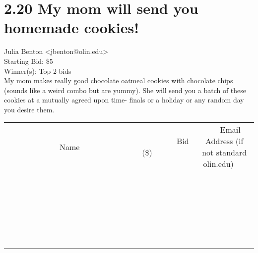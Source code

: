 \documentclass[11pt]{article}
\begin{document}
					\section*{2.20 My mom will send you homemade cookies!}
					Julia Benton <jbenton@olin.edu> \\
					Starting Bid: \$5 \\
					Winner(s): Top 2 bids \\
					My mom makes really good chocolate oatmeal cookies with chocolate chips (sounds like a weird combo but are yummy). She will send you a batch of these cookies at a mutually agreed upon time- finals or a holiday or any random day you desire them. \\
					[6ex]
					\begin{tabular}{c c c}
						~~~~~~~~~~~~~Name~~~~~~~~~~~~~ & ~~~~~~~~~Bid (\$)~~~~~~~~~ & ~~~Email Address (if not standard olin.edu)~~~ \\
				
 & & \\
\hline
 & & \\
\hline
 & & \\
\hline
 & & \\
\hline
 & & \\
\hline
 & & \\
\hline
 & & \\
\hline
 & & \\
\hline
 & & \\
\hline
 & & \\
\hline
 & & \\
\hline
 & & \\
\hline
 & & \\
\hline
 & & \\
\hline
 & & \\
\hline
 & & \\
\hline
 & & \\
\hline
 & & \\
\hline
 & & \\
\hline
 & & \\
\hline
 & & \\
\hline
 & & \\
\hline
 & & \\
\hline
 & & \\
\hline
 & & \\
\hline
 & & \\
\hline
					\end{tabular}
					\clearpage
				
\end{document}

